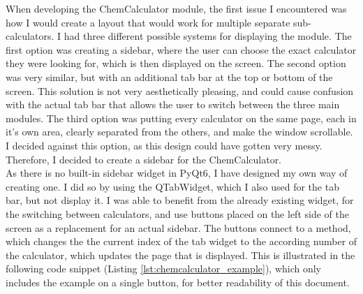 \documentclass[a4paper,12pt]{article}
\begin{document}
When developing the ChemCalculator module, the first issue I encountered was how I would create a layout that would work for multiple separate sub-calculators. I had three different possible systems for displaying the module. The first option was creating a sidebar, where the user can choose the exact calculator they were looking for, which is then displayed on the screen. The second option was very similar, but with an additional tab bar at the top or bottom of the screen. This solution is not very aesthetically pleasing, and could cause confusion with the actual tab bar that allows the user to switch between the three main modules. The third option was putting every calculator on the same page, each in it's own area, clearly separated from the others, and make the window scrollable. I decided against this option, as this design could have gotten very messy. Therefore, I decided to create a sidebar for the ChemCalculator. \\
As there is no built-in sidebar widget in PyQt6, I have designed my own way of creating one. I did so by using the QTabWidget, which I also used for the tab bar, but not display it. I was able to benefit from the already existing widget, for the switching between calculators, and use buttons placed on the left side of the screen as a replacement for an actual sidebar. The buttons connect to a method, which changes the the current index of the tab widget to the according number of the calculator, which updates the page that is displayed. This is illustrated in the following code snippet (Listing \ref{lst:chemcalculator_example}), which only includes the example on a single button, for better readability of this document.
\end{document}
